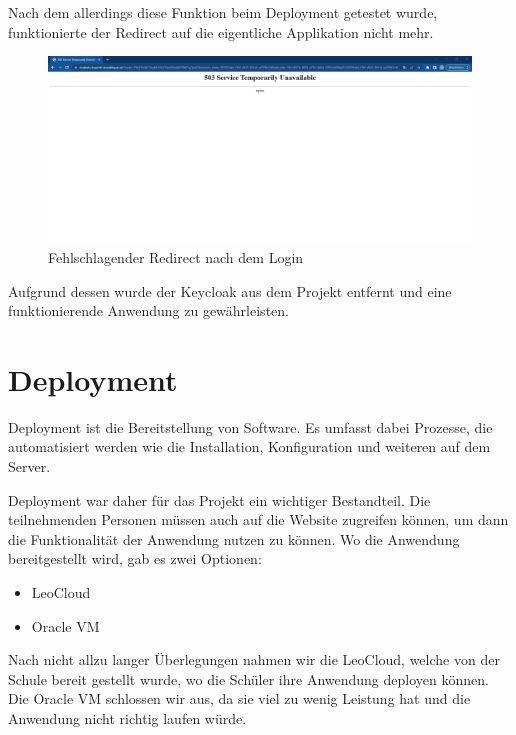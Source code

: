 Nach dem allerdings diese Funktion beim Deployment getestet wurde, funktionierte der Redirect auf die eigentliche Applikation nicht mehr.

\begin{figure}[h]
    \centering
    \includegraphics[scale=0.3]{pics/keycloak.png}
    \caption{Fehlschlagender Redirect nach dem Login}
    \label{lst:keylcoak_login}
\end{figure} 

Aufgrund dessen wurde der Keycloak aus dem Projekt entfernt und eine funktionierende Anwendung zu gewährleisten.  

\newpage

\section{Deployment}

Deployment ist die Bereitstellung von Software. Es umfasst dabei Prozesse, die automatisiert werden wie die Installation, Konfiguration und weiteren auf dem Server. \cite{Deployment}


Deployment war daher für das Projekt ein wichtiger Bestandteil. Die teilnehmenden Personen müssen auch auf die Website zugreifen können, um dann die Funktionalität der Anwendung nutzen zu können. Wo die Anwendung bereitgestellt wird, gab es zwei Optionen:

\begin{itemize}
    \item LeoCloud
    \item Oracle VM
\end{itemize}

Nach nicht allzu langer Überlegungen nahmen wir die LeoCloud, welche von der Schule bereit gestellt wurde, wo die Schüler ihre Anwendung deployen können. Die Oracle VM schlossen wir aus, da sie viel zu wenig Leistung hat und die Anwendung nicht richtig laufen würde.

